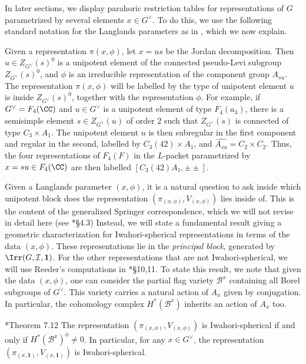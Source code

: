 In later sections, we display parahoric restriction tables for representations of $G$ parametrized by several elements $x\in G^\vee$. To do this, we use the following standard notation for the Langlands parameters as in \cite{Reeder2000}, which we now explain. 
\begin{notation}\label{notation:Langlandsparam}
    Given a representation $\pi(x,\phi)$, let $x=us$ be the Jordan decomposition. Then $u\in Z_{G^\vee}(s)^0$ is a unipotent element of the connected pseudo-Levi subgroup $Z_{G^\vee}(s)^0$, and $\phi$ is an irreducible representation of the component group $A_{su}$. The representation $\pi(x,\phi)$ will be labelled by the type of unipotent element $u$ is inside $Z_{G^\vee}(s)^0$, together with the representation $\phi$. For example, if $G^\vee=F_4(\CC)$ and $u\in G^\vee$ is a unipotent element of type $F_4(a_3)$, there is a semisimple element $s\in Z_{G^\vee}(u)$ of order $2$ such that $Z_{G^\vee}(s)$ is connected of type $C_3\times A_1$. The unipotent element $u$ is then subregular in the first component and regular in the second, labelled by $C_3(42)\times A_1$, and $\widehat{A_{su}}=C_2\times C_2$. Thus, the four representations of $F_4(F)$ in the $L$-packet parametrized by $x=su\in F_4(\CC)$ are then labelled $[C_3(42)A_1,\pm\pm]$. %
\end{notation}

Given a Langlands parameter $(x,\phi)$, it is a natural question to ask inside which unipotent block does the representation $(\pi_{(x,\phi)},V_{(x,\phi)})$ lies inside of. This is the content of the generalized Springer correspondence, which we will not revise in detail here (see \cite{CiubotaruMasonBrownOkada2025}*{\S4.3}) Instead, we will state a fundamental result giving a geometric characterization for Iwahori-spherical representations in terms of the data $(x,\phi)$. These representations lie in the \textit{principal block}, generated by $\Irr(G,\mathcal{I},\mathbf{1})$. For the other representations that are not Iwahori-spherical, we will use Reeder's computations in \cite{Reeder2000}*{\S 10,11}. To state this result, we note that given the data $(x,\phi)$, one can consider the partial flag variety $\mathcal{B}^x$ containing all Borel subgroups of $G^\vee$. This variety carries a natural action of $A_x$ given by conjugation. In particular, the cohomology complex $H^*(\mathcal{B}^x)$ inherits an action of $A_x$ too.
\begin{theorem}\cite{KazhdanLusztig1987}*{Theorem 7.12}
    The representation $(\pi_{(x,\phi)},V_{(x,\phi)})$ is Iwahori-spherical if and only if $H^*(\mathcal{B}^x)^\phi\neq 0$. In particular, for any $x\in G^\vee$, the representation $(\pi_{(x,\mathbf{1})},V_{(x,\mathbf{1})})$ is Iwahori-spherical.
\end{theorem}

